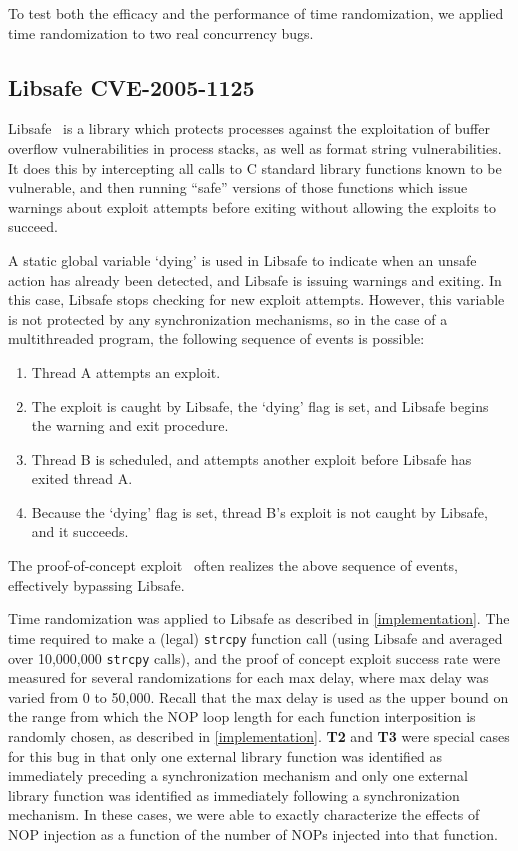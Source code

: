 To test both the efficacy and the performance of time randomization,
we applied time randomization to two real concurrency bugs.
\subsection{Libsafe CVE-2005-1125}
Libsafe~\cite{Tsai2001} is a library which protects processes against the
exploitation of buffer overflow vulnerabilities in process stacks, as well as
format string vulnerabilities.  It does this by intercepting all calls to C
standard library functions known to be vulnerable, and then running ``safe'' versions of those functions which issue warnings about exploit attempts before exiting without allowing the exploits to succeed.

A static global variable `dying' is used in Libsafe to indicate when an unsafe action has already been detected, and Libsafe is issuing warnings and exiting.  In this case, Libsafe stops checking for new exploit attempts.  However, this variable is not protected by any synchronization mechanisms, so in the case of a multithreaded program, the following sequence of events is possible:
\begin{enumerate}
	\item Thread A attempts an exploit.
	\item The exploit is caught by Libsafe, the `dying' flag is set, and Libsafe begins the warning and exit procedure.
	\item Thread B is scheduled, and attempts another exploit before Libsafe has exited thread A.
	\item Because the `dying' flag is set, thread B's exploit is not caught by Libsafe, and it succeeds.
\end{enumerate}
The proof-of-concept exploit~\cite{Bugtraq13190} often realizes the above sequence of events, effectively bypassing Libsafe.

Time randomization was applied to Libsafe as described in \autoref{implementation}.
The time required to make a (legal) \texttt{strcpy} function call (using Libsafe and averaged over 10,000,000 \texttt{strcpy} calls), and the proof of concept exploit success rate were measured for several randomizations for each max delay, where max delay was varied from 0 to 50,000.
Recall that the max delay is used as the upper bound on the range from which the NOP loop length for each function interposition is randomly chosen, as described in \autoref{implementation}.
\textbf{T2} and \textbf{T3} were special cases for this bug in that only one external library function was identified as immediately preceding a synchronization mechanism and only one external library function was identified as immediately following a synchronization mechanism.
In these cases, we were able to exactly characterize the effects of NOP injection as a function of the number of NOPs injected into that function.
